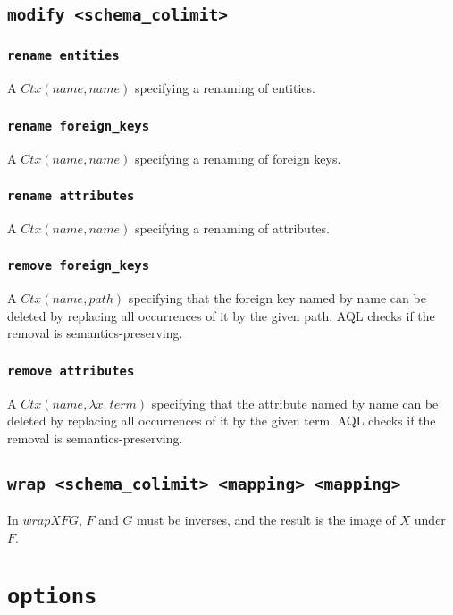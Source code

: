 \documentclass[10pt]{book}
\begin{document}
\section{\tt modify <schema\_colimit>}

\subsection{{\tt rename entities}}
A $Ctx(name,name)$ specifying a renaming of entities.

\subsection{{\tt rename foreign\_keys}}
A $Ctx(name,name)$ specifying a renaming of foreign keys. 

\subsection{{\tt rename attributes}}

A $Ctx(name,name)$ specifying a renaming of attributes. 

\subsection{{\tt remove foreign\_keys}}

A $Ctx(name,path)$ specifying that the foreign key named by name can be deleted by replacing all occurrences of it by the given path.  AQL checks if the removal is semantics-preserving. 

\subsection{{\tt remove attributes}}

A $Ctx(name,\lambda x. \ term)$ specifying that the attribute named by name can be deleted by replacing all occurrences of it by the given term.  AQL checks if the removal is semantics-preserving. 
		
\section{{\tt wrap <schema\_colimit> <mapping> <mapping>}}
In $wrap X F G$, $F$ and $G$ must be inverses, and the result is the image of $X$ under $F$.
		
\chapter{{\tt options}}
\end{document}
